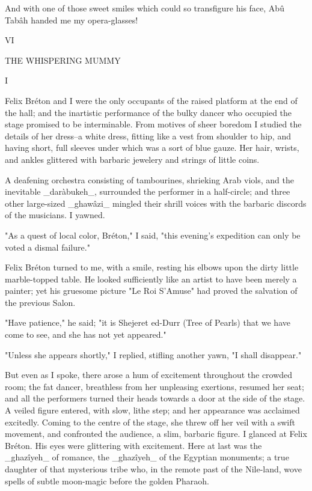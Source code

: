 And with one of those sweet smiles which could so transfigure his
face, Abû Tabâh handed me my opera-glasses!




VI

THE WHISPERING MUMMY


I

Felix Bréton and I were the only occupants of the raised platform
at the end of the hall; and the inartistic performance of the bulky
dancer who occupied the stage promised to be interminable. From
motives of sheer boredom I studied the details of her dress--a white
dress, fitting like a vest from shoulder to hip, and having short,
full sleeves under which was a sort of blue gauze. Her hair, wrists,
and ankles glittered with barbaric jewelery and strings of little
coins.

A deafening orchestra consisting of tambourines, shrieking Arab viols,
and the inevitable _daràbukeh_, surrounded the performer in a
half-circle; and three other large-sized _ghawâzi_ mingled their
shrill voices with the barbaric discords of the musicians. I yawned.

"As a quest of local color, Bréton," I said, "this evening's
expedition can only be voted a dismal failure."

Felix Bréton turned to me, with a smile, resting his elbows upon the
dirty little marble-topped table. He looked sufficiently like an
artist to have been merely a painter; yet his gruesome picture "Le
Roi S'Amuse" had proved the salvation of the previous Salon.

"Have patience," he said; "it is Shejeret ed-Durr (Tree of Pearls)
that we have come to see, and she has not yet appeared."

"Unless she appears shortly," I replied, stifling another yawn,
"I shall disappear."

But even as I spoke, there arose a hum of excitement throughout
the crowded room; the fat dancer, breathless from her unpleasing
exertions, resumed her seat; and all the performers turned their
heads towards a door at the side of the stage. A veiled figure
entered, with slow, lithe step; and her appearance was acclaimed
excitedly. Coming to the centre of the stage, she threw off her
veil with a swift movement, and confronted the audience, a slim,
barbaric figure. I glanced at Felix Bréton. His eyes were glittering
with excitement. Here at last was the _ghazîyeh_ of romance, the
_ghazîyeh_ of the Egyptian monuments; a true daughter of that
mysterious tribe who, in the remote past of the Nile-land, wove
spells of subtle moon-magic before the golden Pharaoh.

